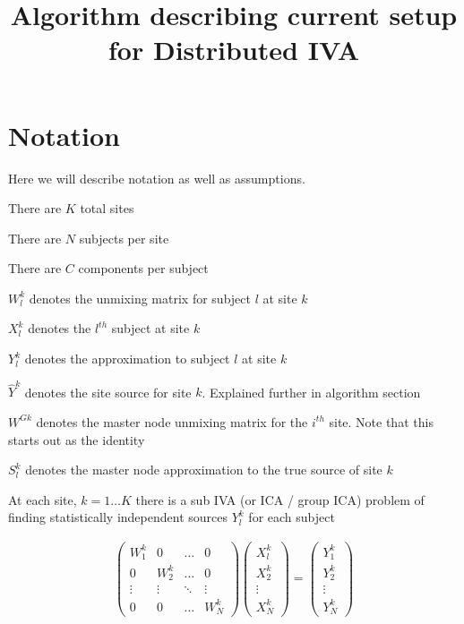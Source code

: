 \documentclass{amsproc}
\title{Algorithm describing current setup for Distributed IVA}
\begin{document}
\maketitle

\section{Notation} Here we will describe notation as well as assumptions.

There are $K$ total sites

There are $N$ subjects per site

There are $C$ components per subject

$W^k_l$ denotes the unmixing matrix for subject $l$ at site $k$

$X^k_l$ denotes the $l^{th}$ subject at site $k$

$Y^k_l$ denotes the approximation to subject $l$ at site $k$

$\hat{Y}^k$ denotes the site source for site $k$. Explained further in algorithm section

$W^{Gk}$ denotes the master node unmixing matrix for the $i^{th}$ site. Note that this starts out as the identity

$S^k_l$ denotes the master node approximation to the true source of site $k$



At each site, $k=1 \dots K$ there is a sub IVA (or ICA / group ICA) problem of finding statistically independent sources $Y^k_l$ for each subject

\begin{align} \label{site_specific}
    \begin{pmatrix}
        W^k_1   & 0         & \dots     & 0         \\
        0       & W^k_2     & \dots     & 0         \\
        \vdots  & \vdots    & \ddots    & \vdots    \\
        0       & 0         & \dots     & W^k_N
    \end{pmatrix}
    \begin{pmatrix}
        X^k_l   \\
        X^k_2   \\
        \vdots  \\
        X^k_N
    \end{pmatrix}
    =
    \begin{pmatrix}
        Y^k_1   \\
        Y^k_2   \\
        \vdots  \\
        Y^k_N
    \end{pmatrix}
\end{align} 
\end{document}
